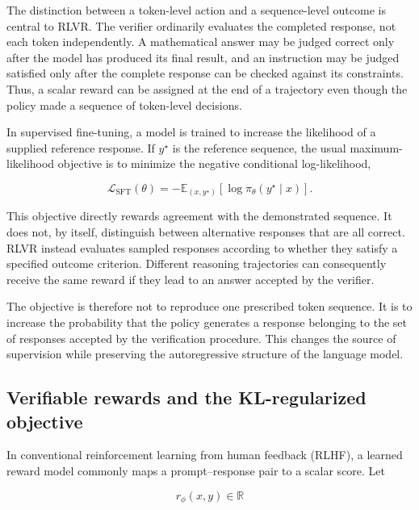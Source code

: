 The distinction between a token-level action and a sequence-level outcome is
central to RLVR. The verifier ordinarily evaluates the completed response,
not each token independently. A mathematical answer may be judged correct
only after the model has produced its final result, and an instruction may be
judged satisfied only after the complete response can be checked against its
constraints. Thus, a scalar reward can be assigned at the end of a trajectory
even though the policy made a sequence of token-level decisions.

In supervised fine-tuning, a model is trained to increase the likelihood of
a supplied reference response. If \(y^\star\) is the reference sequence, the
usual maximum-likelihood objective is to minimize the negative conditional
log-likelihood,

\begin{equation}
    \mathcal{L}_{\mathrm{SFT}}(\theta)
    =
    -\mathbb{E}_{(x,y^\star)}
    \left[
        \log \pi_\theta(y^\star\mid x)
    \right].
    \label{eq:rlvr-sft-objective}
\end{equation}

This objective directly rewards agreement with the demonstrated sequence.
It does not, by itself, distinguish between alternative responses that are
all correct. RLVR instead evaluates sampled responses according to whether
they satisfy a specified outcome criterion. Different reasoning trajectories
can consequently receive the same reward if they lead to an answer accepted
by the verifier.

The objective is therefore not to reproduce one prescribed token sequence.
It is to increase the probability that the policy generates a response
belonging to the set of responses accepted by the verification procedure.
This changes the source of supervision while preserving the autoregressive
structure of the language model.

\subsection{Verifiable rewards and the KL-regularized objective}
\label{subsec:rlvr-objective}

In conventional reinforcement learning from human feedback (RLHF), a learned
reward model commonly maps a prompt--response pair to a scalar score. Let

\begin{equation}
    r_\phi(x,y)\in\mathbb{R}
    \label{eq:rlvr-learned-reward}
\end{equation}

